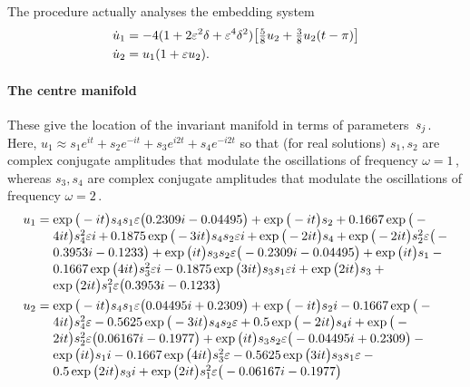 The procedure actually analyses the embedding system
\begin{align*}&
\dot u_{1}=-4(1+2\varepsilon^2\delta+\varepsilon^4\delta^2)\big[\tfrac58u_2+\tfrac38u_2(t-\pi)\big]
\\&
\dot u_{2}= u_1(1+ \varepsilon u_2).
\end{align*}



\paragraph{The centre manifold} 
These give the location of the invariant manifold in terms
of parameters~\(s\sb j\). Here, \(u_1\approx
s_1e^{it}+s_2e^{-it}+s_3e^{i2t}+s_4e^{-i2t}\) so that (for
real solutions) \(s_1,s_2\) are complex conjugate amplitudes
that modulate the oscillations of frequency \(\omega=1\)\,,
whereas \(s_3,s_4\) are complex conjugate amplitudes that
modulate the oscillations of frequency \(\omega=2\)\,.
\begin{align*}&
u_{1}=\ParMath{\exp \big(-i t\big) s_{4} s_{1} \eps \big(0.2309 i-0.04495
\big)+\exp \big(-i t\big) s_{2}+0.1667 \exp \big(-4 i t\big) s_{4}^{2}
 \eps i+0.1875 \exp \big(-3 i t\big) s_{4} s_{2} \eps i+\exp \big(-2 i t
\big) s_{4}+\exp \big(-2 i t\big) s_{2}^{2} \eps \big(-0.3953 i-
0.1233\big)+\exp \big(i t\big) s_{3} s_{2} \eps \big(-0.2309 i-
0.04495\big)+\exp \big(i t\big) s_{1}-0.1667 \exp \big(4 i t\big) s_
{3}^{2} \eps i-0.1875 \exp \big(3 i t\big) s_{3} s_{1} \eps i+\exp \big(
2 i t\big) s_{3}+\exp \big(2 i t\big) s_{1}^{2} \eps \big(0.3953 i-
0.1233\big)}
\\&
u_{2}=\ParMath{\exp \big(-i t\big) s_{4} s_{1} \eps \big(0.04495 i+0.2309
\big)+\exp \big(-i t\big) s_{2} i-0.1667 \exp \big(-4 i t\big) s_{4}^{
2} \eps-0.5625 \exp \big(-3 i t\big) s_{4} s_{2} \eps+0.5 \exp \big(-2 i
 t\big) s_{4} i+\exp \big(-2 i t\big) s_{2}^{2} \eps \big(0.06167 i-
0.1977\big)+\exp \big(i t\big) s_{3} s_{2} \eps \big(-0.04495 i+
0.2309\big)-\exp \big(i t\big) s_{1} i-0.1667 \exp \big(4 i t\big) s
_{3}^{2} \eps-0.5625 \exp \big(3 i t\big) s_{3} s_{1} \eps-0.5 \exp 
\big(2 i t\big) s_{3} i+\exp \big(2 i t\big) s_{1}^{2} \eps \big(-
0.06167 i-0.1977\big)}
\end{align*}

 
